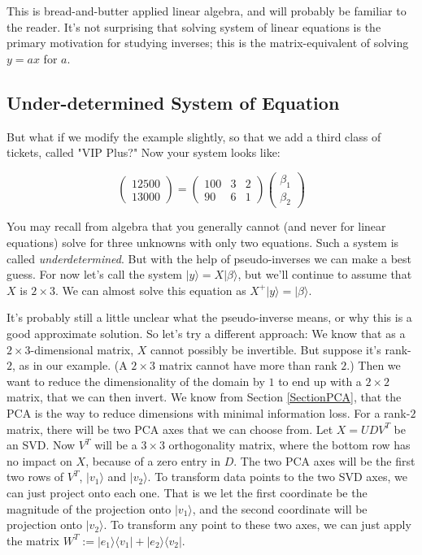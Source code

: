 \documentclass{amsbook}
\begin{document}
This is bread-and-butter applied linear algebra, and will probably be familiar to the reader.  It's not surprising that solving system of linear equations is the primary motivation for studying inverses; this is the matrix-equivalent of solving $y=ax$ for $a$.

\subsection{Under-determined System of Equation}

But what if we modify the example slightly, so that we add a third class of tickets, called "VIP Plus?"  Now your system looks like:

$$
\left(\begin{array}{c} 12500 \\ 13000 \end{array}\right)=\left(\begin{array}{ccc} 100&3&2\\90&6&1\end{array}\right)\left(\begin{array}{c}\beta_1\\ \beta_2\end{array}\right)
$$

You may recall from algebra that you generally cannot (and never for linear equations) solve for three unknowns with only two equations.  Such a system is called {\em underdetermined}.  But with the help of pseudo-inverses we can make a best guess.  For now let's call the system $|y\rangle=X|\beta\rangle$, but we'll continue to assume that $X$ is $2\times 3$.  We can almost solve this equation as $X^+|y\rangle=|\beta\rangle$.

It's probably still a little unclear what the pseudo-inverse means, or why this is a good approximate solution.  So let's try a different approach:  We know that as a $2\times3$-dimensional matrix, $X$ cannot possibly be invertible.  But suppose it's rank-$2$, as in our example.  (A $2\times3$ matrix cannot have more than rank $2$.)  Then we want to reduce the dimensionality of the domain by $1$ to end up with a $2\times2$ matrix, that we can then invert.  We know from Section \ref{SectionPCA}, that the PCA is the way to reduce dimensions with minimal information loss.  For a rank-$2$ matrix, there will be two PCA axes that we can choose from.  Let $X=UDV^T$ be an SVD.  Now $V^T$ will be a $3\times3$ orthogonality matrix, where the bottom row has no impact on $X$, because of a zero entry in $D$.  The two PCA axes will be the first two rows of $V^T$, $|v_1\rangle$ and $|v_2\rangle$.  To transform data points to the two SVD axes, we can just project onto each one.  That is we let the first coordinate be the magnitude of the projection onto $|v_1\rangle$, and the second coordinate will be projection onto $|v_2\rangle$.  To transform any point to these two axes, we can just apply the matrix $W^T:=|e_1\rangle\langle v_1|+|e_2\rangle\langle v_2|$.
\end{document}
